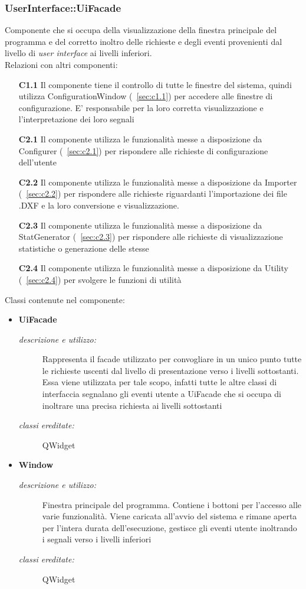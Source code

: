 \subsubsection{UserInterface::UiFacade} \label{sec:c1.2}
Componente che si occupa della visualizzazione della finestra principale del programma e del corretto inoltro delle richieste e degli eventi provenienti dal livello di \textit{user interface} ai livelli inferiori.\\
Relazioni con altri componenti: 
\begin{itemize} 
\item [\textbf{C1.1}]
Il componente tiene il controllo di tutte le finestre del sistema, quindi utilizza ConfigurationWindow (~\ref{sec:c1.1}) per accedere alle finestre di configurazione. E' responsabile per la loro corretta visualizzazione e l'interpretazione dei loro segnali 
\item [\textbf{C2.1}]
Il componente utilizza le funzionalità messe a disposizione da Configurer (~\ref{sec:c2.1}) per rispondere alle richieste di configurazione dell'utente 
\item [\textbf{C2.2}]
Il componente utilizza le funzionalità messe a disposizione da Importer (~\ref{sec:c2.2}) per rispondere alle richieste riguardanti l'importazione dei file .DXF e la loro conversione e visualizzazione. 
\item [\textbf{C2.3}]
Il componente utilizza le funzionalità messe a disposizione da StatGenerator (~\ref{sec:c2.3}) per rispondere alle richieste di visualizzazione statistiche o generazione delle stesse 
\item [\textbf{C2.4}]
Il componente utilizza le funzionalità messe a disposizione da Utility (~\ref{sec:c2.4}) per svolgere le funzioni di utilità 
\end{itemize} 

Classi contenute nel componente: 
\begin{itemize} 
\item \textbf{UiFacade}
\begin{description}
\item [\textit{descrizione e utilizzo:}] Rappresenta il facade utilizzato per convogliare in un unico punto tutte le richieste uscenti dal livello di presentazione verso i livelli sottostanti. Essa viene utilizzata per tale scopo, infatti tutte le altre classi di interfaccia segnalano gli eventi utente a UiFacade che si occupa di inoltrare una precisa richiesta ai livelli sottostanti
\item [\textit{classi ereditate:}] QWidget
\end{description}
\item \textbf{Window}
\begin{description}
\item [\textit{descrizione e utilizzo:}] Finestra principale del programma. Contiene i bottoni per l'accesso alle varie funzionalità. Viene caricata all'avvio del sistema e rimane aperta per l'intera durata dell'esecuzione, gestisce gli eventi utente inoltrando i segnali verso i livelli inferiori
\item [\textit{classi ereditate:}] QWidget
\end{description}
\end{itemize}

